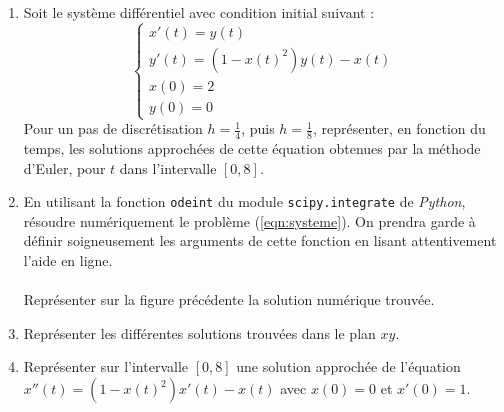 \begin{exercice}
\begin{enumerate}
\item Soit le système différentiel avec condition initial suivant :
\begin{equation}\label{eqn:systeme}
\begin{cases} x'(t)  =  y(t) \\
y'(t)  = (1-x(t)^2)y(t)-x(t) \\
x(0) =  2 \\
y(0) =  0 \end{cases}
\end{equation}
Pour un pas de discrétisation $h=\frac{1}{4}$, puis $h=\frac{1}{8}$, représenter, en fonction du temps, les solutions approchées de cette équation obtenues par la méthode d'Euler, pour $t$ dans l'intervalle $[0,8]$.
\item En utilisant la fonction \texttt{odeint} du module \texttt{scipy.integrate} de \textit{Python}, résoudre numériquement le problème (\ref{eqn:systeme}). On prendra garde à définir soigneusement les arguments de cette fonction en lisant attentivement l'aide en ligne.\\ \\
Représenter sur la figure précédente la solution numérique trouvée. 
\item Représenter les différentes solutions trouvées dans le plan $xy$. 
\item Représenter sur l'intervalle $[0,8]$ une solution approchée de l'équation $x''(t)=(1-x(t)^2)x'(t)-x(t)$ avec $x(0)=0$ et $x'(0)=1$.
\end{enumerate}
\end{exercice}





